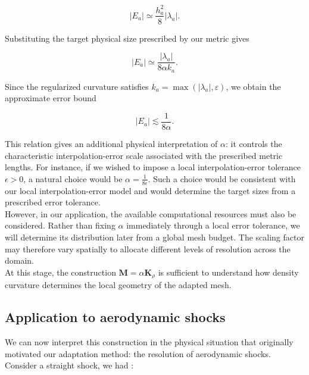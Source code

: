 \documentclass[11pt,a4paper]{article}
\begin{document}
\begin{equation}
    |E_a|
    \simeq
    \frac{h_a^2}{8}|\lambda_a|.
\end{equation}

\noindent
Substituting the target physical size prescribed
by our metric gives

\begin{equation}
    |E_a|
    \simeq
    \frac{|\lambda_a|}{8\alpha k_a}.
\end{equation}

\noindent
Since the regularized curvature satisfies
$k_a=\max(|\lambda_a|,\varepsilon)$, we obtain
the approximate error bound

\begin{equation}
    \boxed{
        |E_a|\lesssim\frac{1}{8\alpha}.
    }
\end{equation}

\noindent
This relation gives an additional physical
interpretation of $\alpha$: it controls the
characteristic interpolation-error scale
associated with the prescribed metric lengths.
For instance, if we wished to impose a local
interpolation-error tolerance $\epsilon>0$,
a natural choice would be $\alpha=\frac{1}{8\epsilon}$.
Such a choice would be consistent with our
local interpolation-error model and would
determine the target sizes from a prescribed
error tolerance.\\

\noindent
However, in our application, the available
computational resources must also be considered.
Rather than fixing $\alpha$ immediately through
a local error tolerance, we will determine its
distribution later from a global mesh budget.
The scaling factor may therefore vary spatially
to allocate different levels of resolution
across the domain.\\


\noindent   
At this stage, the construction
$\mathbf{M}=\alpha\mathbf{K}_\rho$ is sufficient
to understand how density curvature determines
the local geometry of the adapted mesh.



\subsection{Application to aerodynamic shocks}

\noindent
We can now interpret this construction in the
physical situation that originally motivated
our adaptation method: the resolution of
aerodynamic shocks.
Consider a straight shock, we had :
\end{document}
